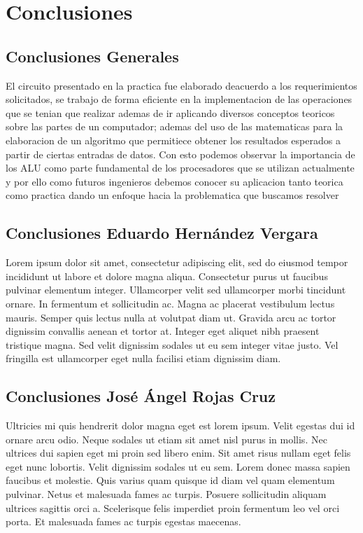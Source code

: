 \section{Conclusiones}
	\subsection{Conclusiones Generales}
	El circuito presentado en la practica fue elaborado deacuerdo a los requerimientos solicitados, se trabajo de forma eficiente en la implementacion de las operaciones que se tenian que realizar ademas de ir aplicando diversos conceptos teoricos sobre las partes de un computador; ademas del uso de las matematicas para la elaboracion de un algoritmo que permitiece obtener los resultados esperados a partir de ciertas entradas de datos. Con esto podemos observar la importancia de los ALU como parte fundamental de los procesadores que se utilizan actualmente y por ello como futuros ingenieros debemos conocer su aplicacion tanto teorica como practica dando un enfoque hacia la problematica que buscamos resolver
	\subsection{Conclusiones Eduardo Hern\'andez Vergara}
		Lorem ipsum dolor sit amet, consectetur adipiscing elit, sed do eiusmod tempor incididunt ut labore et dolore magna aliqua. Consectetur purus ut faucibus pulvinar elementum integer. Ullamcorper velit sed ullamcorper morbi tincidunt ornare. In fermentum et sollicitudin ac. Magna ac placerat vestibulum lectus mauris. Semper quis lectus nulla at volutpat diam ut. Gravida arcu ac tortor dignissim convallis aenean et tortor at. Integer eget aliquet nibh praesent tristique magna. Sed velit dignissim sodales ut eu sem integer vitae justo. Vel fringilla est ullamcorper eget nulla facilisi etiam dignissim diam.
	\subsection{Conclusiones Jos\'e \'Angel Rojas Cruz}
	Ultricies mi quis hendrerit dolor magna eget est lorem ipsum. Velit egestas dui id ornare arcu odio. Neque sodales ut etiam sit amet nisl purus in mollis. Nec ultrices dui sapien eget mi proin sed libero enim. Sit amet risus nullam eget felis eget nunc lobortis. Velit dignissim sodales ut eu sem. Lorem donec massa sapien faucibus et molestie. Quis varius quam quisque id diam vel quam elementum pulvinar. Netus et malesuada fames ac turpis. Posuere sollicitudin aliquam ultrices sagittis orci a. Scelerisque felis imperdiet proin fermentum leo vel orci porta. Et malesuada fames ac turpis egestas maecenas.

